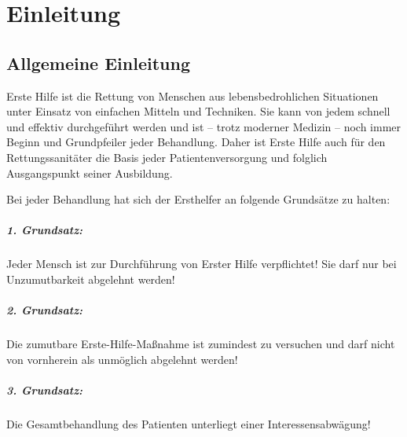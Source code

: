 \section{Einleitung}



\subsection{Allgemeine Einleitung}


Erste Hilfe ist die Rettung von Menschen aus lebensbedrohlichen
Situationen unter Einsatz von einfachen Mitteln und Techniken. Sie
kann von jedem schnell und effektiv
durchgeführt werden und ist -- trotz moderner Medizin -- noch
immer Beginn und Grundpfeiler jeder Behandlung. Daher ist
Erste Hilfe auch für den Rettungssanitäter die Basis jeder 
Patientenversorgung und folglich Ausgangspunkt seiner
Ausbildung.



Bei jeder Behandlung hat sich der Ersthelfer an folgende Grundsätze zu halten:

\subparagraph{1. Grundsatz:} Jeder Mensch ist zur Durchführung von Erster Hilfe
verpflichtet! Sie darf nur bei Unzumutbarkeit abgelehnt werden!


\subparagraph{2. Grundsatz:} Die zumutbare Erste-Hilfe-Maßnahme ist zumindest zu
versuchen und darf nicht von vornherein als unmöglich abgelehnt werden!


\subparagraph{3. Grundsatz:} Die Gesamtbehandlung des Patienten unterliegt einer
Interessensabwägung!

